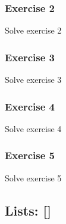 \documentclass[10pt, a4paper]{beamer} %
\begin{document}
{
\bfseries
\begin{frame}[c, fragile]\frametitle{Exercise 2}
  
Solve exercise 2
\end{frame}

\begin{frame}[c, fragile]\frametitle{Exercise 3}
Solve exercise 3
\end{frame}


\begin{frame}[c, fragile]\frametitle{Exercise 4}
Solve exercise 4
\end{frame}

\begin{frame}[c, fragile]\frametitle{Exercise 5}
Solve exercise 5
\end{frame}
}


\subsection{Lists: []} %
\label{sub:lists}
\end{document}
